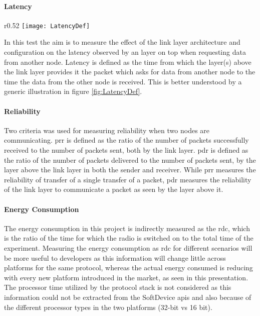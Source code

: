 \paragraph{Latency}  \label{6para:latency}
\begin{wrapfigure}{r}{0.52\textwidth}
	\vspace{-10pt}
	\centering
	\texttt{[image: LatencyDef]}
	\caption{Illustration of latency measurement}
	\vspace{-10pt}
	\label{fig:LatencyDef}
\end{wrapfigure}
In this test the aim is to measure the effect of the link layer architecture and configuration on the latency observed by an layer on top when requesting data from another node. Latency is defined as the time from which the layer(s) above the link layer provides it the packet which asks for data from another node to the time the data from the other node is received. This is better understood by a generic illustration in figure \ref{fig:LatencyDef}.

\paragraph{Reliability}
Two criteria was used for measuring reliability when two nodes are communicating. \gls{prr} is defined as the ratio of the number of packets successfully received to the number of packets sent, both by the link layer. \gls{pdr} is defined as the ratio of the number of packets delivered to the number of packets sent, by the layer above the link layer in both the sender and receiver. While \gls{prr} measures the reliability of transfer of a single transfer of a packet, \gls{pdr} measures the reliability of the link layer to communicate a packet as seen by the layer above it.

\paragraph{Energy Consumption}
The energy consumption in this project is indirectly measured as the \acrfull{rdc}, which is the ratio of the time for which the radio is switched on to the total time of the experiment. Measuring the energy consumption as \gls{rdc} for different scenarios will be more useful to developers as this information will change little across platforms for the same protocol, whereas the actual energy consumed is reducing with every new platform introduced in the market, as seen in this presentation\cite{Bernegger2014}. The processor time utilized by the protocol stack is not considered as this information could not be extracted from the SoftDevice \glspl{api} and also because of the different processor types in the two platforms (32-bit vs 16 bit). 

